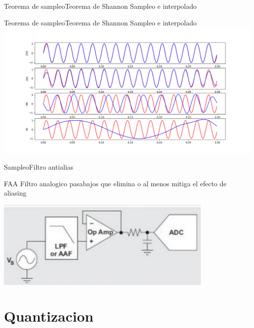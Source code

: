  \begin{frame}{Teorema de sampleo}{Teorema de Shannon}
    \handsonicon
    Sampleo e interpolado
       
    \vfill
 \end{frame}
 \begin{frame}{Teorema de sampleo}{Teorema de Shannon}
    \handsonicon
    Sampleo e interpolado
    \center\includegraphics[width=1.0\textwidth]{1_clase/teorema_sampleo_interpolado}
    \vfill
 \end{frame}
 \begin{frame}{Sampleo}{Filtro antialias}
    \begin{block}{FAA}
       Filtro \alert{analogico} pasabajos que elimina o al menos mitiga el efecto de aliasing
    \end{block}
    \center\includegraphics[width=0.8\textwidth]{1_clase/filtro_anti_aliasing}
    \vfill
 \end{frame}
 \section{Quantizacion}
